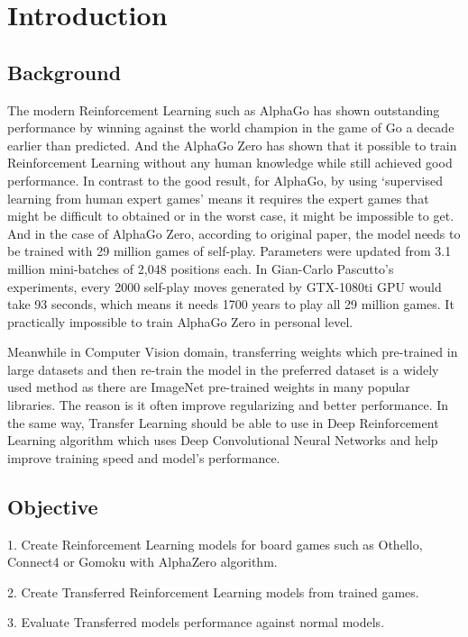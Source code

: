 \documentclass[12pt,a4paper]{article}
\begin{document}
\section{Introduction}
\subsection{Background}
{
\hspace{0.6cm}The modern Reinforcement Learning such as AlphaGo has shown outstanding performance by winning against the world champion in the game of Go a decade earlier than predicted\cite{GovsCom}\cite{AGWeb}. And the AlphaGo Zero has shown that it possible to train Reinforcement Learning without any human knowledge while still achieved good performance\cite{AlphaGoZero}\cite{AlphaZero}. In contrast to the good result, for AlphaGo, by using ‘supervised learning from human expert games’\cite{AlphaGo} means it requires the expert games that might be difficult to obtained or in the worst case, it might be impossible to get. And in the case of AlphaGo Zero, according to original paper\cite{AlphaGoZero}, the model needs to be trained with 29 million games of self-play. Parameters were updated from 3.1 million mini-batches of 2,048 positions each. In Gian-Carlo Pascutto's experiments, every 2000 self-play moves generated by GTX-1080ti GPU would take 93 seconds, which means it needs 1700 years to play all 29 million games\cite{GCP}. It practically impossible to train AlphaGo Zero in personal level.\par
\hspace{0cm} Meanwhile in Computer Vision domain, transferring weights which pre-trained in large datasets and then re-train the model in the preferred dataset is a widely used method as there are ImageNet\cite{Imagenet} pre-trained weights in many popular libraries\cite{TFpaper}\cite{Pytorch}\cite{Keras}. The reason is it often improve regularizing and better performance\cite{Transferable}. In the same way, Transfer Learning should be able to use in Deep Reinforcement Learning algorithm which uses Deep Convolutional Neural Networks and help improve training speed and model's performance.\par
}
\subsection{Objective}
{
\hspace{0.6cm} 1. Create Reinforcement Learning models for board games such as Othello, Connect4 or Gomoku with AlphaZero algorithm.\par
\hspace{0cm} 2. Create Transferred Reinforcement Learning models from trained games.\par
\hspace{0cm} 3. Evaluate Transferred models performance against normal models.\par
}
\end{document}
